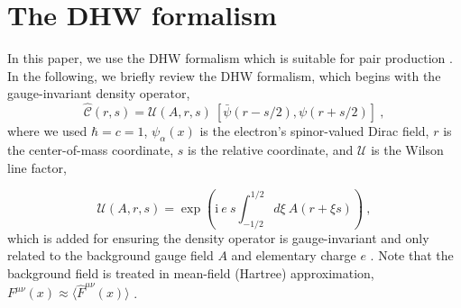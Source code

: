 \documentclass[aps,preprint,superscriptaddress]{revtex4}
\begin{document}
\section{The DHW formalism}\label{method}

In this paper, we use the DHW formalism which is suitable for pair production \cite{Bialynicki:1991pd, Heben:2010pd, Hebenstreit:1ar, Hebenstreit:2br, Blinne1,Blinne2,Blinne3}.
In the following, we briefly review the DHW formalism, which begins with the gauge-invariant density operator,
\begin{equation}
\hat {\mathcal C} \left( r , s \right) = \mathcal U \left(A,r,s
\right) \ \left[ \bar \psi \left( r - s/2 \right), \psi \left( r +
s/2 \right) \right]\ ,
\end{equation}
where we used $\hbar = c = 1 $, $\psi_\alpha (x)$ is the electron's spinor-valued Dirac field,
$r$ is the center-of-mass coordinate, $s$ is the relative coordinate, and $\mathcal U$ is the Wilson line factor,

\begin{equation}
\mathcal U \left(A,r,s \right) = \exp \left( \mathrm{i} \ e \ s \int_{-1/2}^{1/2} d
\xi \ A \left(r+ \xi s \right) \right)\ ,
\end{equation}
which is added for ensuring the density operator is gauge-invariant and only related to the background gauge field $A$ and elementary charge $e$ \cite{Zhuang:1998pd}. Note that the background field is treated in mean-field (Hartree) approximation,
$F^{\mu \nu} \left( {x} \right) \approx \langle \hat F^{\mu \nu} \left(
{x} \right) \rangle $ .
\end{document}
